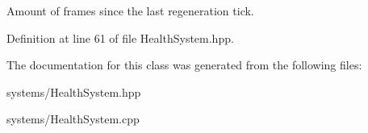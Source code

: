 Amount of frames since the last regeneration tick. 



Definition at line 61 of file Health\+System.\+hpp.



The documentation for this class was generated from the following files\+:\begin{DoxyCompactItemize}
\item 
systems/Health\+System.\+hpp\item 
systems/Health\+System.\+cpp\end{DoxyCompactItemize}

